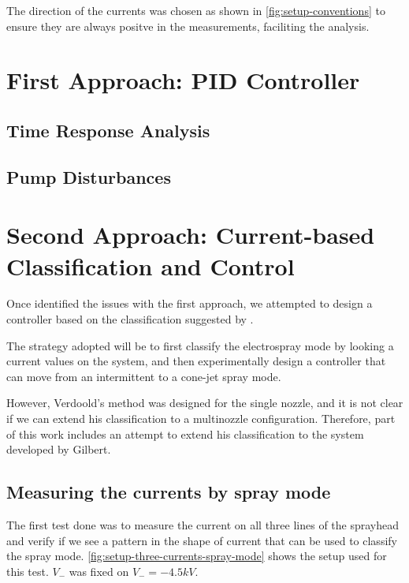 \documentclass[oneside,12pt]{article}
\begin{document}
The direction of the currents was chosen as shown in \autoref{fig:setup-conventions} to ensure they are always positve 
in the measurements, faciliting the analysis.


\section{First Approach: PID Controller}\label{sec:pid}

\subsection{Time Response Analysis}

\subsection{Pump Disturbances}

\section{Second Approach: Current-based Classification and Control}\label{sec:current-based}

Once identified the issues with the first approach, we attempted to design a 
controller based on the classification suggested by \cite{Verdoold2013}.

The strategy adopted will be to first classify the electrospray mode by looking a current values 
on the system, and then experimentally design a controller that can move from an intermittent
to a cone-jet spray mode.

However, Verdoold's method was designed for the single nozzle, and it is not clear if we can 
extend his classification to a multinozzle configuration. Therefore, part of this work 
includes an attempt to extend his classification to the system developed by 
Gilbert.


\subsection{Measuring the currents by spray mode}

The first test done was to measure the current on all three lines of the sprayhead and 
verify if we see a pattern in the shape of current that can be used to classify the spray mode.
\autoref{fig:setup-three-currents-spray-mode} shows the setup used for this test. $V_-$ was fixed on 
$V_- = - 4.5 kV$.
\end{document}
